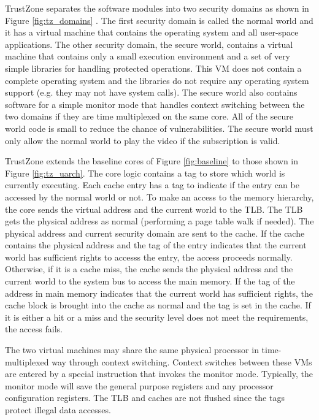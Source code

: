     TrustZone separates the software modules into two security domains as shown 
    in Figure \ref{fig:tz_domains} . The first security domain is called the 
    normal world and it has a virtual machine that contains the operating 
    system and all user-space applications. The other security domain, the 
    secure world, contains a virtual machine that contains only a small 
    execution environment and a set of very simple libraries for handling 
    protected operations. This VM does not contain a complete operating system 
    and the libraries do not require any operating system support (e.g. they 
    may not have system calls). The secure world also contains software for a 
    simple monitor mode that handles context switching between the two domains 
    if they are time multiplexed on the same core. All of the secure world code 
    is small to reduce the chance of vulnerabilities. The secure world must 
    only allow the normal world to play the video if the subscription is valid.

    TrustZone extends the baseline cores of Figure \ref{fig:baseline} to
    those shown in Figure \ref{fig:tz_uarch}. The core logic contains a tag to 
    store which world is currently executing. Each cache entry has a tag to 
    indicate if the entry can be accessed by the normal world or not. To make 
    an access to the memory hierarchy, the core sends the virtual address and 
    the current world to the TLB. The TLB gets the physical address as normal 
    (performing a page table walk if needed). The physical address and current 
    security domain are sent to the cache. If the cache contains the physical 
    address and the tag of the entry indicates that the current world has 
    sufficient rights to accesss the entry, the access proceeds normally.  
    Otherwise, if it is a cache miss, the cache sends the physical address and 
    the current world to the system bus to access the main memory. If the tag 
    of the address in main memory indicates that the current world has 
    sufficient rights, the cache block is brought into the cache as normal and 
    the tag is set in the cache. If it is either a hit or a miss and the 
    security level does not meet the requirements, the access fails.

    The two virtual machines may share the same physical processor in time-multiplexed 
    way through context switching. Context switches between these VMs are entered by a special 
    instruction that invokes the monitor mode.  Typically, the monitor mode 
    will save the general purpose registers and any processor configuration 
    registers. The TLB and caches are not flushed since the tags protect 
    illegal data accesses.

